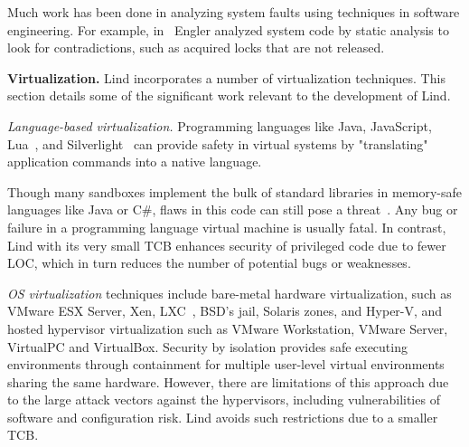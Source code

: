 Much work has been done in analyzing system faults using techniques in
software engineering. For example,
in~\cite{engler2001bugs} Engler analyzed system code by static analysis
to look for contradictions, such as acquired locks that are
not released.

\textbf{Virtualization.}
Lind incorporates a number of virtualization techniques. This section details some
of the significant work relevant to the development of Lind.

\textit{Language-based virtualization.}
Programming languages like Java, JavaScript, Lua~\cite{Lua}, and
Silverlight~\cite{Silverlight} can provide safety in virtual systems by
"translating" application commands into a native language.

Though many sandboxes implement the bulk of standard libraries in
memory-safe languages like Java or C\#, flaws in this code can
still pose a threat~\cite{JavaBugs, Java-Lessons}.
Any bug or failure in a programming language virtual
machine is usually fatal. In contrast, Lind with its very small TCB
enhances security of privileged code due to fewer LOC, which in
turn reduces the number of potential bugs or weaknesses. %


\textit{OS virtualization}
techniques include
bare-metal hardware virtualization, such as VMware ESX Server, Xen,
LXC~\cite{LXC}, BSD's jail, Solaris zones, and Hyper-V, and
hosted hypervisor virtualization such as VMware
Workstation, VMware Server, VirtualPC and VirtualBox.
%
Security by isolation \cite{Qubes, Overshadow, SecureVM, HypSec}
provides safe executing environments through containment for multiple
user-level virtual environments sharing the same hardware.
However, there are limitations of this approach due to
the large attack vectors against the hypervisors, including
vulnerabilities of software and configuration risk. Lind avoids such restrictions due to a smaller TCB.

